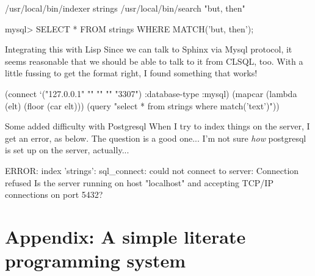 \begin{idea}
/usr/local/bin/indexer strings
/usr/local/bin/search "but, then"

mysql> SELECT * FROM strings WHERE MATCH('but, then');
\end{idea}

\begin{notate}{Integrating this with Lisp}
Since we can talk to Sphinx via Mysql
protocol, it seems reasonable that we should be able to talk to
it from CLSQL, too.  With a little fussing to get the format
right, I found something that works!
\end{notate}

\begin{idea}
(connect `("127.0.0.1" "" "" "" "3307") :database-type :mysql)
(mapcar (lambda (elt) (floor (car elt)))
  (query "select * from strings where match('text')"))
\end{idea}

\begin{notate}{Some added difficulty with Postgresql}
When I try to index things on the server, I get an
error, as below.  The question is a good one... I'm
not sure \emph{how} postgresql is set up on the server,
actually...
\end{notate}

\begin{idea}
ERROR: index 'strings': sql_connect: could not connect to server:
Connection refused
Is the server running on host "localhost" and accepting
TCP/IP connections on port 5432?
\end{idea}

\section{Appendix: A simple literate programming system} \label{appendix-lit}

